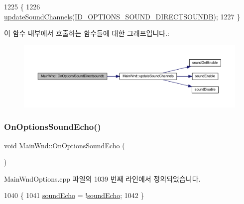 \begin{DoxyCode}
1225 \{
1226   \mbox{\hyperlink{class_main_wnd_a30b67d9db53d79122684a81e549ebd1c}{updateSoundChannels}}(\mbox{\hyperlink{resource_8h_a9d78136742bd464a8e37ca8eeda3555a}{ID\_OPTIONS\_SOUND\_DIRECTSOUNDB}});
1227 \}
\end{DoxyCode}
이 함수 내부에서 호출하는 함수들에 대한 그래프입니다.\+:
\nopagebreak
\begin{figure}[H]
\begin{center}
\leavevmode
\includegraphics[width=350pt]{class_main_wnd_a19e333bd762c2497d3ff416d21c3c0c0_cgraph}
\end{center}
\end{figure}
\mbox{\label{class_main_wnd_a8b2ccc9d323d27e0b748e0e03c544537}} 
\subsubsection{\texorpdfstring{On\+Options\+Sound\+Echo()}{OnOptionsSoundEcho()}}
{\footnotesize\ttfamily void Main\+Wnd\+::\+On\+Options\+Sound\+Echo (\begin{DoxyParamCaption}{ }\end{DoxyParamCaption})\hspace{0.3cm}{\ttfamily [protected]}}



Main\+Wnd\+Options.\+cpp 파일의 1039 번째 라인에서 정의되었습니다.


\begin{DoxyCode}
1040 \{
1041   \mbox{\hyperlink{gb_sound_8cpp_a687b8b28b681969302cdf6e804bcf8db}{soundEcho}} = !\mbox{\hyperlink{gb_sound_8cpp_a687b8b28b681969302cdf6e804bcf8db}{soundEcho}};
1042 \}
\end{DoxyCode}
\mbox{\label{class_main_wnd_a8adfcf00230b2bf44aa4a077bcdb6a0e}} 
